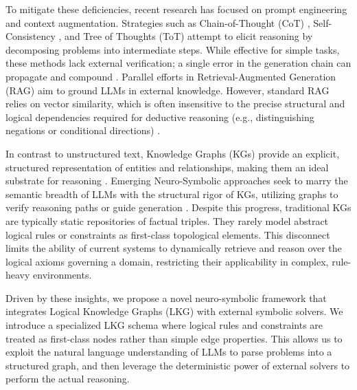 \documentclass{article}
\theoremstyle{plain}
\theoremstyle{definition}
\theoremstyle{remark}
\begin{document}
To mitigate these deficiencies, recent research has focused on prompt engineering and context augmentation. Strategies such as Chain-of-Thought (CoT) \cite{wei2022cot}, Self-Consistency \cite{Wang2022selfcon}, and Tree of Thoughts (ToT) \cite{Yao2023tree} attempt to elicit reasoning by decomposing problems into intermediate steps. While effective for simple tasks, these methods lack external verification; a single error in the generation chain can propagate and compound \cite{Dziri2023faith}. Parallel efforts in Retrieval-Augmented Generation (RAG) \cite{Lewis2020retrieval, Guu2020retrieval} aim to ground LLMs in external knowledge. However, standard RAG relies on vector similarity, which is often insensitive to the precise structural and logical dependencies required for deductive reasoning (e.g., distinguishing negations or conditional directions) \cite{creswell2022selection}.

In contrast to unstructured text, Knowledge Graphs (KGs) provide an explicit, structured representation of entities and relationships, making them an ideal substrate for reasoning \cite{ji2021survey, pan2024unifying}. Emerging Neuro-Symbolic approaches seek to marry the semantic breadth of LLMs with the structural rigor of KGs, utilizing graphs to verify reasoning paths or guide generation \cite{Sun2023thinkongraph, Luo2023reasoningongraphs, Jiang2023StructGPT, edge2024from}. Despite this progress, traditional KGs are typically static repositories of factual triples. They rarely model abstract logical rules or constraints as first-class topological elements. This disconnect limits the ability of current systems to dynamically retrieve and reason over the logical axioms governing a domain, restricting their applicability in complex, rule-heavy environments.

Driven by these insights, we propose a novel neuro-symbolic framework that integrates Logical Knowledge Graphs (LKG) with external symbolic solvers. We introduce a specialized LKG schema where logical rules and constraints are treated as first-class nodes rather than simple edge properties. This allows us to exploit the natural language understanding of LLMs to parse problems into a structured graph, and then leverage the deterministic power of external solvers to perform the actual reasoning.
\end{document}

